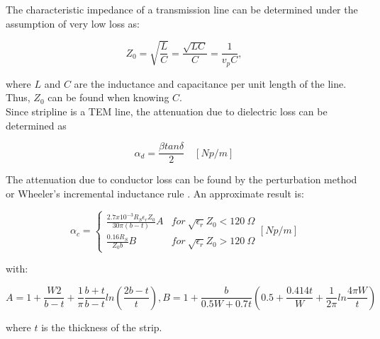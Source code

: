 \noindent The characteristic impedance of a transmission line can be determined under the assumption of very low loss as:

\begin{equation}\label{th:eq28}
Z_{0} =\sqrt{\frac{L}{C}}=\frac{\sqrt{LC}}{C}=\frac{1}{v_{p}C},
\end{equation}

\noindent where $L$ and $C$ are the inductance and capacitance per unit length of the line. Thus, $Z_0$ can be found when knowing $C$.
\\
\indent Since stripline is a TEM line, the attenuation due to dielectric loss can be determined as 

\begin{equation}\label{th:eq29}
\alpha _{d}=\frac{\beta tan\delta }{2} \quad  [Np/m]
\end{equation}

\noindent The attenuation due to conductor loss can be found by the perturbation method or Wheeler’s incremental inductance rule \cite{pozar}. An approximate result is:

\begin{equation}\label{th:eq30}
  \alpha _{c} =
  \begin{cases}
    \frac{2.7x10^{-3}R_{S}\epsilon _{r}Z_{0}}{30\pi (b-t)}A & for\ \sqrt{\epsilon _{r}}Z_{0} < 120\ \Omega \\
    \frac{0.16R_{S}}{Z_{0}b}B  & for\ \sqrt{\epsilon _{r}}Z_{0} > 120\ \Omega
  \end{cases}
 [Np/m]
\end{equation}

\noindent with:

\begin{subequations}\label{th:eq31}
\begin{equation}\label{th:eq31a}
A=1+\frac{W2}{b-t}+\frac{1}{\pi}\frac{b+t}{b-t}ln(\frac{2b-t}{t}),
\end{equation}
\begin{equation}\label{th:eq31b}
B=1+\frac{b}{0.5W+0.7t}(0.5+\frac{0.414t}{W}+\frac{1}{2\pi}ln\frac{4\pi W}{t})
\end{equation}
\end{subequations}

\noindent where $t$ is the thickness of the strip.
\\

